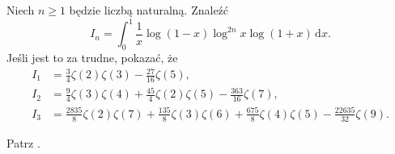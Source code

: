 %

\begin{problem_with_solution}
    \label{valean_1_10}%
    Niech $n \ge 1$ będzie liczbą naturalną.
    Znaleźć
    \begin{equation}
        I_n = \int_0^1 \frac 1 x \log(1-x) \log^{2n} x \log (1+x) \,\mathrm{d}x.
    \end{equation}
    Jeśli jest to za trudne, pokazać, że
    \begin{align}
        I_1 & = \frac 3 4 \zeta (2) \zeta (3) - \frac {27}{16} \zeta(5), \\
        I_2 & = \frac 9 4 \zeta (3) \zeta (4) + \frac{45}{4} \zeta(2) \zeta(5) - \frac{363}{16} \zeta (7), \\
        I_3 & = \frac{2835}{8} \zeta(2) \zeta (7) + \frac {135}{8} \zeta (3) \zeta (6) + \frac {675}{8} \zeta (4) \zeta (5) - \frac {22635}{32} \zeta (9).
    \end{align} 
\end{problem_with_solution}


\begin{solution}
    Patrz \cite[s. 6, 7]{valean19}.
\end{solution}

%